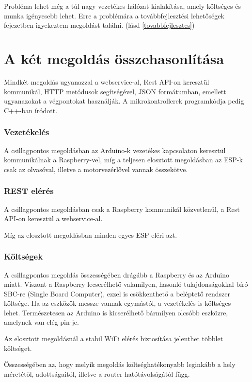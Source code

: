 \documentclass[
]{thesis-ekf}
\theoremstyle{definition}
\theoremstyle{remark}
\begin{document}
Probléma lehet még a túl nagy vezetékes hálózat kialakítása, amely költséges és munka igényesebb lehet. Erre a problémára a továbbfejlesztési lehetőségek fejezetben igyekeztem megoldást találni. (lásd \ref{tovabbfejlesztes})

\chapter{A két megoldás összehasonlítása}

Mindkét megoldás ugyanazzal a webservice-al, Rest API-on keresztül kommunikál, HTTP metódusok segítségével, JSON formátumban, emellett ugyanazokat a végpontokat használják. A mikrokontrollerek programkódja pedig C++-ban íródott.

\subsection*{Vezetékelés}
    A csillagpontos megoldásban az Arduino-k vezetékes kapcsolaton keresztül kommunikálnak a Raspberry-vel, míg a teljesen elosztott megoldásban az ESP-k csak az olvasóval, illetve a motorvezérlővel vannak összekötve. 
    
\subsection*{REST elérés}

    A csillagpontos megoldásban csak a Raspberry kommunikál közvetlenül, a Rest API-on keresztül a webservice-al.
    
    Míg az elosztott megoldásban minden egyes ESP eléri azt.
    
\subsection*{Költségek}
    A csillagpontos megoldás összességében drágább a Raspberry és az Arduino miatt. Viszont a Raspberry lecserélhető valamilyen, hasonló tulajdonságokkal bíró SBC-re (Single Board Computer), ezzel is csökkenthető a beléptető rendszer költsége. Ha az eszközök messze vannak egymástól, a vezetékelés is költséges lehet. Természetesen az Arduino is kicserélhető bármilyen olcsóbb eszközre, amelynek van elég pin-je.
    
    Az elosztott megoldásnál a stabil WiFi elérés biztosítása jelenthet többlet költséget.
    
    Összességében az, hogy melyik megoldás költséghatékonyabb leginkább a hely méretétől, adottságaitól, illetve a router hatótávolságától függ.
    
\end{document}
